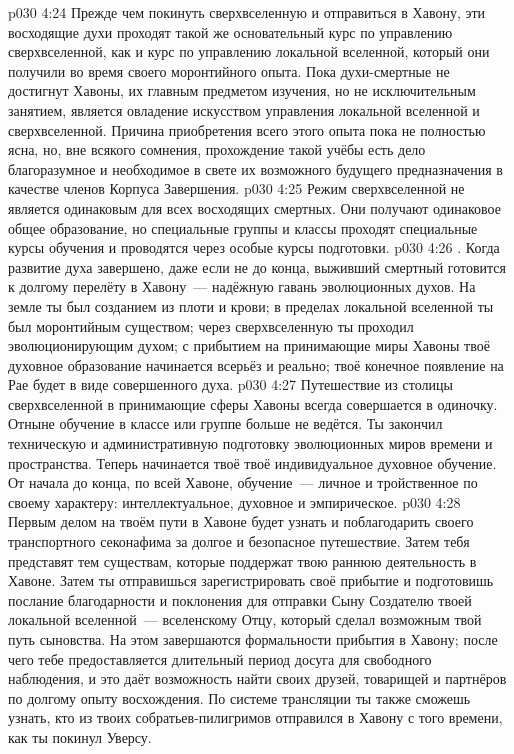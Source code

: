\vs p030 4:24 Прежде чем покинуть сверхвселенную и отправиться в Хавону, эти восходящие духи проходят такой же основательный курс по управлению сверхвселенной, как и курс по управлению локальной вселенной, который они получили во время своего моронтийного опыта. Пока духи\hyp{}смертные не достигнут Хавоны, их главным предметом изучения, но не исключительным занятием, является овладение искусством управления локальной вселенной и сверхвселенной. Причина приобретения всего этого опыта пока не полностью ясна, но, вне всякого сомнения, прохождение такой учёбы есть дело благоразумное и необходимое в свете их возможного будущего предназначения в качестве членов Корпуса Завершения.
\vs p030 4:25 Режим сверхвселенной не является одинаковым для всех восходящих смертных. Они получают одинаковое общее образование, но специальные группы и классы проходят специальные курсы обучения и проводятся через особые курсы подготовки.
\vs p030 4:26 . Когда развитие духа завершено, даже если не до конца, выживший смертный готовится к долгому перелёту в Хавону~--- надёжную гавань эволюционных духов. На земле ты был созданием из плоти и крови; в пределах локальной вселенной ты был моронтийным существом; через сверхвселенную ты проходил эволюционирующим духом; с прибытием на принимающие миры Хавоны твоё духовное образование начинается всерьёз и реально; твоё конечное появление на Рае будет в виде совершенного духа.
\vs p030 4:27 Путешествие из столицы сверхвселенной в принимающие сферы Хавоны всегда совершается в одиночку. Отныне обучение в классе или группе больше не ведётся. Ты закончил техническую и административную подготовку эволюционных миров времени и пространства. Теперь начинается твоё  твоё индивидуальное духовное обучение. От начала до конца, по всей Хавоне, обучение~--- личное и тройственное по своему характеру: интеллектуальное, духовное и эмпирическое.
\vs p030 4:28 Первым делом на твоём пути в Хавоне будет узнать и поблагодарить своего транспортного секонафима за долгое и безопасное путешествие. Затем тебя представят тем существам, которые поддержат твою раннюю деятельность в Хавоне. Затем ты отправишься зарегистрировать своё прибытие и подготовишь послание благодарности и поклонения для отправки Сыну Создателю твоей локальной вселенной~--- вселенскому Отцу, который сделал возможным твой путь сыновства. На этом завершаются формальности прибытия в Хавону; после чего тебе предоставляется длительный период досуга для свободного наблюдения, и это даёт возможность найти своих друзей, товарищей и партнёров по долгому опыту восхождения. По системе трансляции ты также сможешь узнать, кто из твоих собратьев\hyp{}пилигримов отправился в Хавону с того времени, как ты покинул Уверсу.
